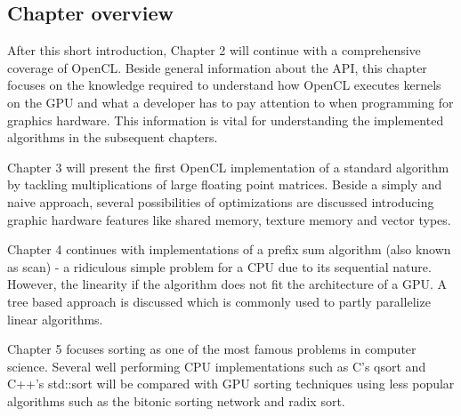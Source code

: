\subsection{Chapter overview}

After this short introduction, Chapter 2 will continue with a comprehensive coverage of OpenCL. Beside general information about the API, this chapter focuses on the knowledge required to understand how OpenCL executes kernels on the GPU and what a developer has to pay attention to when programming for graphics hardware. This information is vital for understanding the implemented algorithms in the subsequent chapters.

Chapter 3 will present the first OpenCL implementation of a standard algorithm by tackling multiplications of large floating point matrices. Beside a simply and naive approach, several possibilities of optimizations are discussed introducing graphic hardware features like shared memory, texture memory and vector types.

\pagebreak

Chapter 4 continues with implementations of a prefix sum algorithm (also known as scan) - a ridiculous simple problem for a CPU due to its sequential nature. However, the linearity if the algorithm does not fit the architecture of a GPU. A tree based approach is discussed which is commonly used to partly parallelize linear algorithms.

Chapter 5 focuses sorting as one of the most famous problems in computer science. Several well performing CPU implementations such as C's qsort and C++'s std::sort will be compared with GPU sorting techniques using less popular algorithms such as the bitonic sorting network and radix sort.
